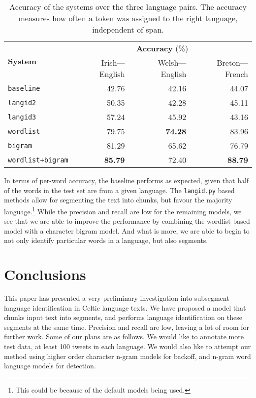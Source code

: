 \documentclass[11pt]{article}
\begin{document}
\begin{table}
\begin{center}
\begin{tabular}{|l|r|r|r|}
\hline
\multirow{2}{*}{\textbf{System}} &  \multicolumn{3}{c|}{\textbf{Accuracy} (\%)} \\\cline{2-4}
       &   Irish---English & Welsh---English & Breton---French \\ 
\hline
\texttt{baseline} & 42.76 & 42.16 & 44.07 \\
\hline
\texttt{langid2} & 50.35 & 42.28 & 45.11  \\
\hline
\texttt{langid3} & 57.24 & 45.92 & 43.16 \\
\hline
\texttt{wordlist} & 79.75 & \textbf{74.28} & 83.96 \\
\hline
\texttt{bigram} & 81.29 & 65.62 & 76.79 \\
\hline
\texttt{wordlist+bigram} & \textbf{85.79} & 72.40 & \textbf{88.79} \\
\hline
\end{tabular}
\end{center}
\caption{Accuracy of the systems over the three language pairs. The accuracy measures how often a token
  was assigned to the right language, independent of span.}
\label{table:accuracy}
\end{table}

In terms of per-word accuracy, the baseline performs as expected, given that half of the words in the test set are from a given language. 
The \texttt{langid.py} based methods allow for segmenting the text into chunks, but favour the majority language.\footnote{This could be because of the default models being used.} While the precision and recall are low for the remaining models, we see that we are able to improve 
the performance by combining the wordlist based model with a character bigram model. And what is more, we are able to begin to not only 
identify particular words in a language, but also segments.

\section{Conclusions}
\label{sec:conclusions}

This paper has presented a very preliminary investigation into subsegment language identification in Celtic language texts. We have
proposed a model that chunks input text into segments, and performs language identification on these segments at the same time. Precision and
recall are low, leaving a lot of room for further work. Some of our plans are as follows. We would like to annotate more test data,
at least 100 tweets in each language. We would also like to attempt our method using higher order character n-gram models for backoff, and
n-gram word language models for detection. 
\end{document}
